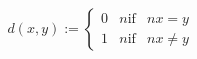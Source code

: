 \documentclass[preview]{standalone}
\begin{document}
\begin{align*}
d(x,y) := \begin{cases} 0 & n \text{if} & n x=y \\1 & n \text{if} & n x \neq y\end{cases}
\end{align*}
\end{document}
